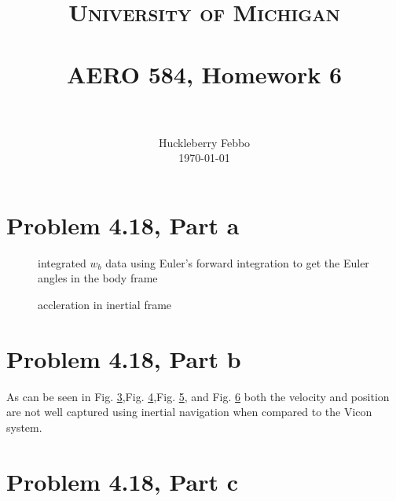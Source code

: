 \documentclass[paper=a4, fontsize=11pt]{scrartcl}
\title{
		\usefont{OT1}{bch}{b}{n}
		\normalfont \normalsize \textsc{University of Michigan} \\ [25pt]
		\horrule{0.5pt} \\[0.4cm]
		\huge AERO 584, Homework  6 \\
		\horrule{2pt} \\[0.5cm]
}
\author{
		\normalfont 								\normalsize
         Huckleberry Febbo\\[-3pt]		\normalsize
        \today
}
\date{}
\numberwithin{equation}{section}		%
\numberwithin{figure}{section}			%
\numberwithin{table}{section}				%
\begin{document}
\maketitle



\section*{Problem 4.18, Part a}


\begin{figure}[!htb]
	\centering
    
	\caption{integrated $w_b$ data  using Euler's forward integration to get the Euler angles in the body frame \label{fig:f1}}
\end{figure}

\begin{figure}[!htb]
	\centering
    
	\caption{accleration in inertial frame \label{fig:f2}}
\end{figure}

\section*{Problem 4.18, Part b}
 As can be seen in Fig. \ref{fig:f3},Fig. \ref{fig:f4},Fig. \ref{fig:f5}, and Fig. \ref{fig:f6} both the velocity and position are not well captured using inertial navigation when compared to the Vicon system.
 
\begin{figure}[!htb]
	\centering
    
	\caption{ \label{fig:f3}}
\end{figure}
\begin{figure}[!htb]
	\centering
    
	\caption{ \label{fig:f4}}
\end{figure}
\begin{figure}[!htb]
	\centering
    
	\caption{ \label{fig:f5}}
\end{figure}
\begin{figure}[!htb]
	\centering
    
	\caption{ \label{fig:f6}}
\end{figure}

\section*{Problem 4.18, Part c}

\end{document}
